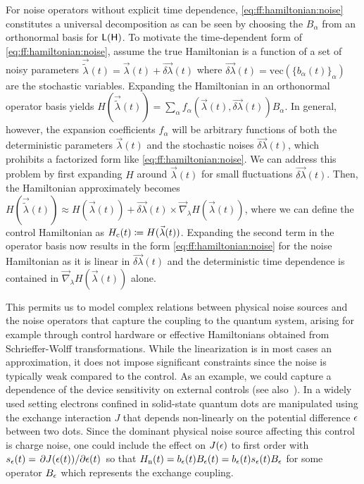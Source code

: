 For noise operators without explicit time dependence, \cref{eq:ff:hamiltonian:noise} constitutes a universal decomposition as can be seen by choosing the $B_\alpha$ from an orthonormal basis for $\mathsf{L}(\mathsf{H})$.
To motivate the time-dependent form of \cref{eq:ff:hamiltonian:noise}, assume the true Hamiltonian is a function of a set of noisy parameters $\vec{\tilde{\lambda}}(t) = \vec{\lambda}(t) + \vec{\delta\lambda}(t)$ where $\vec{\delta\lambda}(t) = \text{vec}(\{b_\alpha(t)\}_\alpha)$ are the stochastic variables.
Expanding the Hamiltonian in an orthonormal operator basis yields $H(\vec{\tilde{\lambda}}(t)) = \sum_\alpha f_\alpha(\vec{\lambda}(t), \vec{\delta\lambda}(t)) B_\alpha$.
In general, however, the expansion coefficients $f_\alpha$ will be arbitrary functions of both the deterministic parameters $\vec{\lambda}(t)$ and the stochastic noises $\vec{\delta\lambda}(t)$, which prohibits a factorized form like \cref{eq:ff:hamiltonian:noise}.
We can address this problem by first expanding $H$ around $\vec{\lambda}(t)$ for small fluctuations $\vec{\delta\lambda}(t)$.
Then, the Hamiltonian approximately becomes $H(\vec{\tilde{\lambda}}(t)) \approx H(\vec{\lambda}(t)) + \vec{\delta\lambda}(t)\times\vec{\nabla}_{\lambda} H(\vec{\lambda}(t))$, where we can define the control Hamiltonian as $H_{\mathrm{c}}(t)\coloneqq H(\vec{\lambda}(t))$.
Expanding the second term in the operator basis now results in the form \eqref{eq:ff:hamiltonian:noise} for the noise Hamiltonian as it is linear in $\vec{\delta\lambda}(t)$ and the deterministic time dependence is contained in $\vec{\nabla}_{\lambda} H(\vec{\lambda}(t))$ alone.

This permits us to model complex relations between physical noise sources and the noise operators that capture the coupling to the quantum system, arising for example through control hardware or effective Hamiltonians obtained from \eg Schrieffer-Wolff transformations.
While the linearization is in most cases an approximation, it does not impose significant constraints since the noise is typically weak compared to the control.
As an example, we could capture a dependence of the device sensitivity on external controls (see also~).
In a widely used setting electrons confined in solid-state quantum dots are manipulated using the exchange interaction $J$ that depends non-linearly on the potential difference $\epsilon$ between two dots.
Since the dominant physical noise source affecting this control is charge noise, one could include the effect on $J(\epsilon)$ to first order with $s_\epsilon(t)=\pdv*{J(\epsilon(t))}{\epsilon(t)}$ so that $H_{\mathrm{n}}(t) = b_\epsilon(t) B_\epsilon(t)  =  b_\epsilon(t) s_\epsilon(t) B_\epsilon$ for some operator $B_\epsilon$ which represents the exchange coupling.

